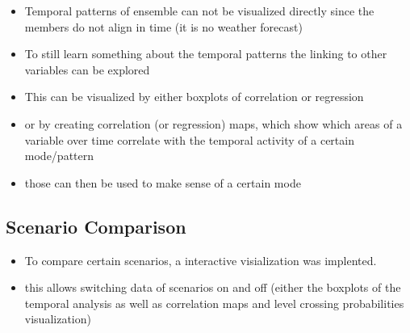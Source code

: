\begin{itemize}
  \item Temporal patterns of ensemble can not be visualized directly since the members do not align in time (it is no weather forecast)
  \item To still learn something about the temporal patterns the linking to other variables can be explored 
  \item This can be visualized by either boxplots of correlation or regression
  \item or by creating correlation (or regression) maps, which show which areas of a variable over time correlate with the temporal activity of a certain mode/pattern 
  \item those can then be used to make sense of a certain mode 
\end{itemize}

\subsection{Scenario Comparison} %
\label{sec:Scenario Comparison}

\begin{itemize}
  \item To compare certain scenarios, a interactive visialization was implented. 
  \item this allows switching data of scenarios on and off (either the boxplots of the temporal analysis as well as correlation maps and level crossing probabilities visualization)
\end{itemize}



